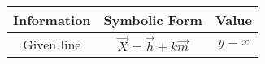 \begin{tabular}{|c|c|c|}
	\hline
	Information&Symbolic Form & Value\\
	\hline
	Given line& $\vec{X}=\vec{h} + k\vec{m}$&$y=x$\\  
	\hline
\end{tabular}

